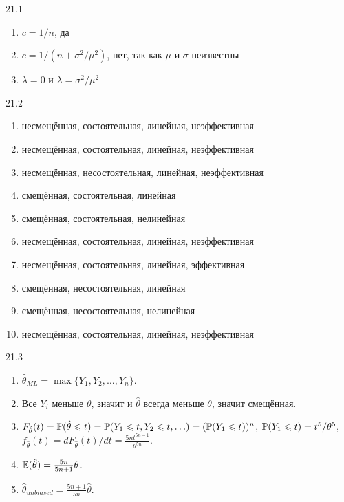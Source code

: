 \protect \hypertarget {soln:21.1}{}
\begin{solution}{{21.1}}
    \begin{enumerate}
      \item $c=1/n$, да
      \item $c=1/(n+\sigma^2/\mu^2)$, нет, так как $\mu$ и $\sigma$ неизвестны
      \item $\lambda=0$ и $\lambda=\sigma^2/\mu^2$
    \end{enumerate}
  
\end{solution}
\protect \hypertarget {soln:21.2}{}
\begin{solution}{{21.2}}
    \begin{enumerate}
    \item несмещённая, состоятельная, линейная, неэффективная
    \item несмещённая, состоятельная, линейная, неэффективная
    \item несмещённая, несостоятельная, линейная, неэффективная
    \item смещённая, состоятельная, линейная
    \item смещённая, состоятельная, нелинейная
    \item несмещённая, состоятельная, линейная, неэффективная
    \item несмещённая, состоятельная, линейная, эффективная
    \item смещённая, несостоятельная, линейная
    \item смещённая, несостоятельная, нелинейная
    \item несмещённая, состоятельная, линейная, неэффективная
    \end{enumerate}
  
\end{solution}
\protect \hypertarget {soln:21.3}{}
\begin{solution}{{21.3}}
\begin{enumerate}
\item $\hat\theta_{ML} = \max\{ Y_1, Y_2, \ldots, Y_n\}$.
\item Все $Y_i$ меньше $\theta$, значит и $\hat\theta$ всегда меньше $\theta$, значит смещённая.
\item $F_{\hat\theta}(t) = \P(\hat\theta \leq t) = \P(Y_1 \leq t, Y_2 \leq t, \ldots) = (\P(Y_1 \leq t))^n$, $\P(Y_1 \leq t) = t^5/\theta^5$, $f_{\hat\theta}(t) = dF_{\hat\theta}(t)/dt = \frac{5n t^{5n-1}}{\theta^{5n}}$.
\item $\E(\hat\theta) = \frac{5n}{5n+1}\theta$.
\item $\hat\theta_{unbiased} = \frac{5n+1}{5n}\hat\theta$.
\end{enumerate}
\end{solution}
